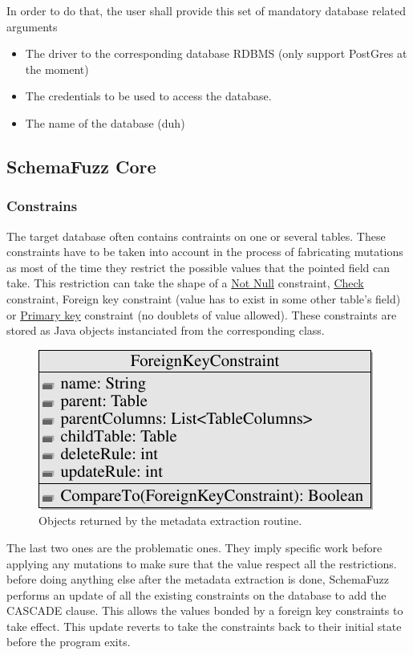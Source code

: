 \documentclass{article}
\begin{document}
\begin{empfile}
In order to do that, the user shall provide this set of mandatory database related arguments
			\begin{itemize}
 				\item The driver to the corresponding database RDBMS (only support PostGres at the moment)
 				\item The credentials to be used to access the database.
 				\item The name of the database (duh)
			\end{itemize}
		\subsection{SchemaFuzz Core}		
			\subsubsection{Constrains}
The target database often contains contraints on one or several tables. These constraints have to be taken into account in the process of fabricating mutations as most of the time they restrict the possible values that the pointed field can take. This restriction can take the shape of a \underline {Not Null} constraint, \underline{Check} constraint, {Foreign key} constraint (value has to exist in some other table's field) or \underline{Primary key} constraint (no doublets of value allowed). These constraints are stored as Java objects instanciated from the corresponding class.

\begin{figure} 
\centering
\includegraphics[scale=1]{ForeignKeyClassDiagram-1.pdf}
\caption{Objects returned by the metadata extraction routine.}
\end{figure}

The last two ones are the problematic ones. They imply specific work before applying any mutations to make sure that the value respect all the restrictions. before doing anything else after the metadata extraction is done, SchemaFuzz performs an update of all the existing constraints on the database to add the CASCADE clause. This allows the values bonded by a foreign key constraints to take effect. This update reverts to take the constraints back to their initial state before the program exits.

\end{empfile}
\end{document}
